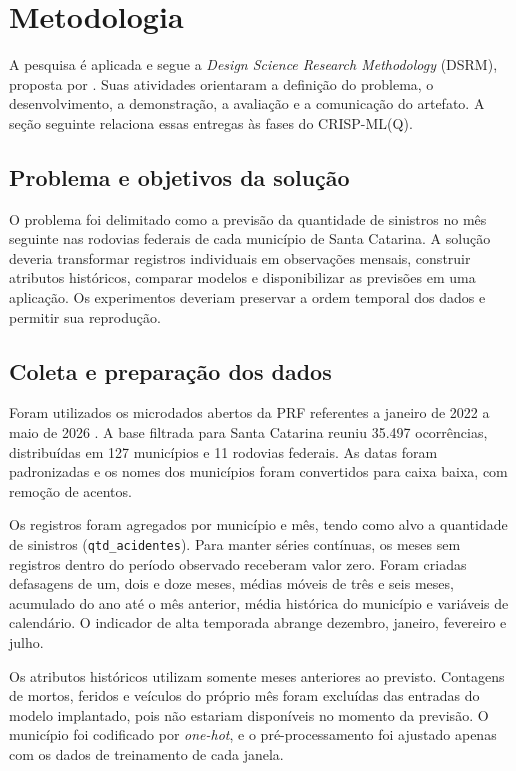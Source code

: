 \documentclass[12pt]{article}
\begin{document}
\section{Metodologia}

A pesquisa é aplicada e segue a \textit{Design Science Research Methodology} (DSRM), proposta por \cite{peffers2007dsrm}. Suas atividades orientaram a definição do problema, o desenvolvimento, a demonstração, a avaliação e a comunicação do artefato. A seção seguinte relaciona essas entregas às fases do CRISP-ML(Q).

\subsection{Problema e objetivos da solução}

O problema foi delimitado como a previsão da quantidade de sinistros no mês seguinte nas rodovias federais de cada município de Santa Catarina. A solução deveria transformar registros individuais em observações mensais, construir atributos históricos, comparar modelos e disponibilizar as previsões em uma aplicação. Os experimentos deveriam preservar a ordem temporal dos dados e permitir sua reprodução.

\subsection{Coleta e preparação dos dados}

Foram utilizados os microdados abertos da PRF referentes a janeiro de 2022 a maio de 2026 \cite{prf2026dados}. A base filtrada para Santa Catarina reuniu 35.497 ocorrências, distribuídas em 127 municípios e 11 rodovias federais. As datas foram padronizadas e os nomes dos municípios foram convertidos para caixa baixa, com remoção de acentos.

Os registros foram agregados por município e mês, tendo como alvo a quantidade de sinistros (\texttt{qtd\_acidentes}). Para manter séries contínuas, os meses sem registros dentro do período observado receberam valor zero. Foram criadas defasagens de um, dois e doze meses, médias móveis de três e seis meses, acumulado do ano até o mês anterior, média histórica do município e variáveis de calendário. O indicador de alta temporada abrange dezembro, janeiro, fevereiro e julho.

Os atributos históricos utilizam somente meses anteriores ao previsto. Contagens de mortos, feridos e veículos do próprio mês foram excluídas das entradas do modelo implantado, pois não estariam disponíveis no momento da previsão. O município foi codificado por \textit{one-hot}, e o pré-processamento foi ajustado apenas com os dados de treinamento de cada janela.
\end{document}
